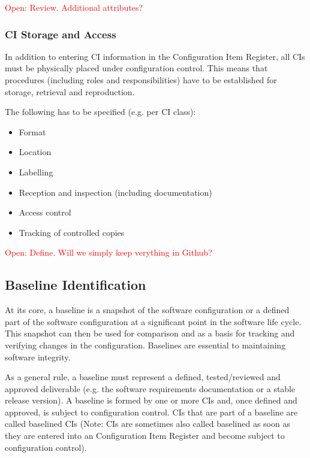 \documentclass{template/openetcs_article}
\begin{document}
\textcolor{red}{Open: Review. Additional attributes?}


\subsubsection{CI Storage and Access} %
\label{sec:CI Storage and Access}

In addition to entering CI information in the Configuration Item Register, all CIs must be physically placed under configuration control. This means that procedures (including roles and responsibilities) have to be established for storage, retrieval and reproduction.

The following has to be specified (e.g. per CI class):

\vspace{-10pt}
\begin{itemize}
\item Format
\item Location
\item Labelling
\item Reception and inspection (including documentation)
\item Access control
\item Tracking of controlled copies
\end{itemize}

\textcolor{red}{Open: Define. Will we simply keep verything in Github?}


\subsection{Baseline Identification} %
\label{sec:Baseline Identification}

At its core, a baseline is a snapshot of the software configuration or a defined part of the software configuration at a significant point in the software life cycle. This snapshot can then be used for comparison and as a basis for tracking and verifying changes in the configuration. Baselines are essential to maintaining software integrity.

As a general rule, a baseline must represent a defined, tested/reviewed and approved deliverable (e.g. the software requirements documentation or a stable release version). A baseline is formed by one or more CIs and, once defined and approved, is subject to configuration control. CIs that are part of a baseline are called baselined CIs (Note: CIs are sometimes also called baselined as soon as they are entered into an Configuration Item Register and become subject to configuration control).
\end{document}
